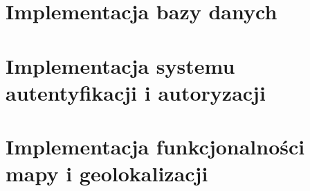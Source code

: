 \section{Implementacja bazy danych}

\section{Implementacja systemu autentyfikacji i autoryzacji}

\section{Implementacja funkcjonalności mapy i geolokalizacji}
